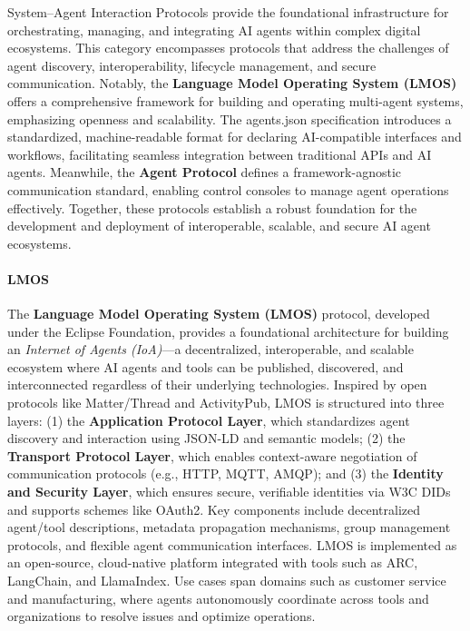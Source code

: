 \documentclass[10pt,preprint]{article}
\begin{document}
System–Agent Interaction Protocols provide the foundational infrastructure for orchestrating, managing, and integrating AI agents within complex digital ecosystems. This category encompasses protocols that address the challenges of agent discovery, interoperability, lifecycle management, and secure communication. Notably, the \textbf{Language Model Operating System (LMOS)} offers a comprehensive framework for building and operating multi-agent systems, emphasizing openness and scalability. The agents.json specification introduces a standardized, machine-readable format for declaring AI-compatible interfaces and workflows, facilitating seamless integration between traditional APIs and AI agents. Meanwhile, the \textbf{Agent Protocol} defines a framework-agnostic communication standard, enabling control consoles to manage agent operations effectively. Together, these protocols establish a robust foundation for the development and deployment of interoperable, scalable, and secure AI agent ecosystems.



\paragraph{LMOS~\citep{lmos2025}} The \textbf{Language Model Operating System (LMOS)}  protocol, developed under the Eclipse Foundation, provides a foundational architecture for building an \emph{Internet of Agents (IoA)}—a decentralized, interoperable, and scalable ecosystem where AI agents and tools can be published, discovered, and interconnected regardless of their underlying technologies. Inspired by open protocols like Matter/Thread and ActivityPub, LMOS is structured into three layers: (1) the \textbf{Application Protocol Layer}, which standardizes agent discovery and interaction using JSON-LD and semantic models; (2) the \textbf{Transport Protocol Layer}, which enables context-aware negotiation of communication protocols (e.g., HTTP, MQTT, AMQP); and (3) the \textbf{Identity and Security Layer}, which ensures secure, verifiable identities via W3C DIDs and supports schemes like OAuth2. Key components include decentralized agent/tool descriptions, metadata propagation mechanisms, group management protocols, and flexible agent communication interfaces. LMOS is implemented as an open-source, cloud-native platform integrated with tools such as ARC, LangChain, and LlamaIndex. Use cases span domains such as customer service and manufacturing, where agents autonomously coordinate across tools and organizations to resolve issues and optimize operations.
\end{document}
